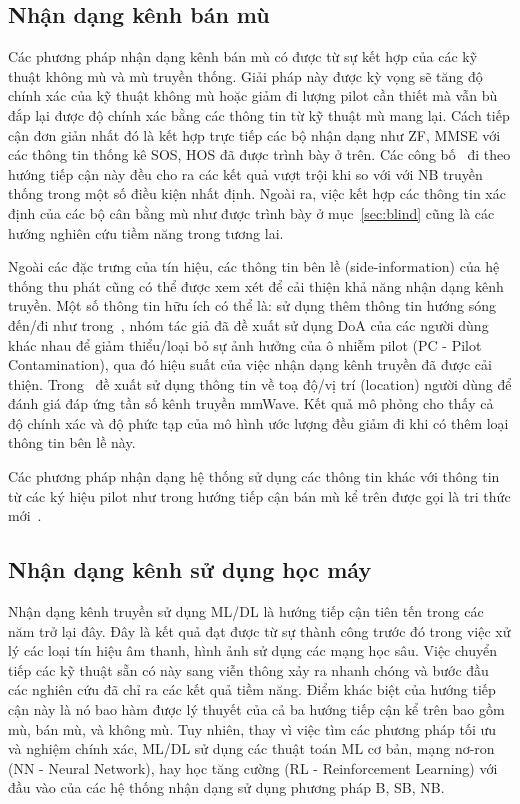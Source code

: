 \subsection{Nhận dạng kênh bán mù} \label{sec:semi}

Các phương pháp nhận dạng kênh bán mù có được từ sự kết hợp của các kỹ thuật không mù và mù truyền thống. Giải pháp này được kỳ vọng sẽ tăng độ chính xác của kỹ thuật không mù hoặc giảm đi lượng pilot cần thiết mà vẫn bù đắp lại được độ chính xác bằng các thông tin từ kỹ thuật mù mang lại. Cách tiếp cận đơn giản nhất đó là kết hợp trực tiếp các bộ nhận dạng như ZF, MMSE với các thông tin thống kê SOS, HOS đã được trình bày ở trên. Các công bố~\cite{Wan2008, Ladaycia2019, Rekik2021} đi theo hướng tiếp cận này đều cho ra các kết quả vượt trội khi so với với NB truyền thống trong một số điều kiện nhất định. Ngoài ra, việc kết hợp các thông tin xác định của các bộ cân bằng mù như được trình bày ở mục~\ref{sec:blind} cũng là các hướng nghiên cứu tiềm năng trong tương lai.

Ngoài các đặc trưng của tín hiệu, các thông tin bên lề (side-information) của hệ thống thu phát cũng có thể được xem xét để cải thiện khả năng nhận dạng kênh truyền. Một số thông tin hữu ích có thể là: sử dụng thêm thông tin hướng sóng đến/đi như trong~\cite{Wang2016}, nhóm tác giả đã đề xuất sử dụng DoA của các người dùng khác nhau để giảm thiểu/loại bỏ sự ảnh hưởng của ô nhiễm pilot (PC - Pilot Contamination), qua đó hiệu suất của việc nhận dạng kênh truyền đã được cải thiện. Trong~\cite{Lin2020} đề xuất sử dụng thông tin về toạ độ/vị trí (location) người dùng để đánh giá đáp ứng tần số kênh truyền mmWave. Kết quả mô phỏng cho thấy cả độ chính xác và độ phức tạp của mô hình ước lượng đều giảm đi khi có thêm loại thông tin bên lề này.

Các phương pháp nhận dạng hệ thống sử dụng các thông tin khác với thông tin từ các ký hiệu pilot như trong hướng tiếp cận bán mù kể trên được gọi là tri thức mới~\cite{InSI}.

\subsection{Nhận dạng kênh sử dụng học máy}

Nhận dạng kênh truyền sử dụng ML/DL là hướng tiếp cận tiên tến trong các năm trở lại đây. Đây là kết quả đạt được từ sự thành công trước đó trong việc xử lý các loại tín hiệu âm thanh, hình ảnh sử dụng các mạng học sâu. Việc chuyển tiếp các kỹ thuật sẵn có này sang viễn thông xảy ra nhanh chóng và bước đầu các nghiên cứu đã chỉ ra các kết quả tiềm năng. Điểm khác biệt của hướng tiếp cận này là nó bao hàm được lý thuyết của cả ba hướng tiếp cận kể trên bao gồm mù, bán mù, và không mù. Tuy nhiên, thay vì việc tìm các phương pháp tối ưu và nghiệm chính xác, ML/DL sử dụng các thuật toán ML cơ bản, mạng nơ-ron (NN - Neural Network), hay học tăng cường (RL - Reinforcement Learning) với đầu vào của các hệ thống nhận dạng sử dụng phương pháp B, SB, NB.

